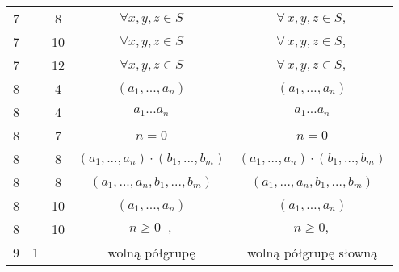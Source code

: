 \documentclass[a4paper,11pt]{article}
\begin{document}
\begin{center}
\begin{tabular}{|c|c|c|c|c|}
    7  & &  8 & $\forall x, y, z \in S$ & $\forall \, x, y, z \in S,$ \\
    7  & & 10 & $\forall x, y, z \in S$ & $\forall \, x, y, z \in S,$ \\
    7  & & 12 & $\forall x, y, z \in S$ & $\forall \, x, y, z \in S,$ \\
    8  & &  4 & $( a_{ 1 }, ..., a_{ n } )$ & $( a_{ 1 }, \ldots, a_{ n } )$ \\
    8  & &  4 & $a_{ 1 } ... a_{ n }$ & $a_{ 1 } \ldots a_{ n }$ \\
    8  & &  7 & $n \!\! = \!\! 0$ & $n = 0$ \\
    8  & &  8 & $( a_{ 1 }, ..., a_{ n } ) \cdot ( b_{ 1 }, ..., b_{ m } )$
           & $( a_{ 1 }, \ldots, a_{ n } ) \cdot ( b_{ 1 }, \ldots, b_{ m } )$ \\
    8  & &  8 & $( a_{ 1 }, ..., a_{ n }, b_{ 1 }, ..., b_{ m } )$
           & $( a_{ 1 }, \ldots, a_{ n }, b_{ 1 }, \ldots, b_{ m } )$ \\
    8  & & 10 & $( a_{ 1 }, ..., a_{ n } )$ & $( a_{ 1 }, \ldots, a_{ n } )$ \\
    8  & & 10 & $n \geq 0\;\;,$ & $n \geq 0,$ \\
    9  &  1 & & wolną półgrupę & wolną półgrupę słowną \\
    \hline
  \end{tabular}





  \newpage


\end{center}
\end{document}
